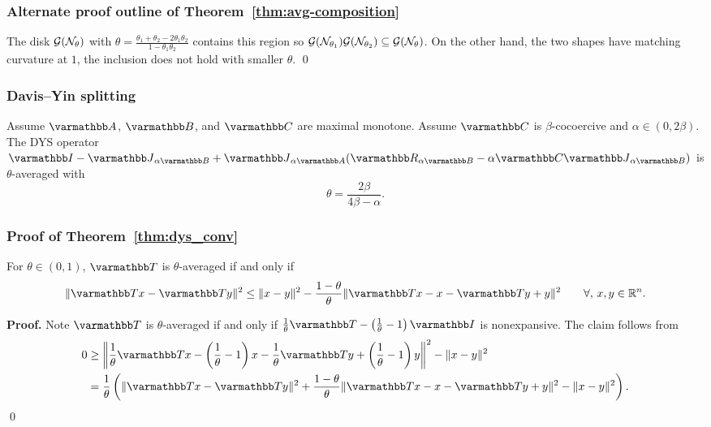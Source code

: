 \documentclass[10pt,mathserif]{beamer}
\begin{document}
\begin{frame}[plain]
\begin{figure}
\begin{subfigure}[b]{0.3\textwidth}
{
}
\end{subfigure}
\end{figure}
\end{frame}

\begin{frame}
\frametitle{Alternate proof outline of Theorem~\ref{thm:avg-composition}}
The disk ${\mathcal{G}}({\mathcal{N}}_\theta)$ with 
$\theta=\frac{\theta_1+\theta_2-2\theta_1\theta_2}{1-\theta_1\theta_2}$
contains this region so ${\mathcal{G}}({\mathcal{N}}_{\theta_1}){\mathcal{G}}({\mathcal{N}}_{\theta_2})\subseteq {\mathcal{G}}({\mathcal{N}}_\theta)$.
On the other hand, the two shapes have matching curvature at $1$, the inclusion does not hold with smaller $\theta$.
\qed
\end{frame}


\begin{frame}
\frametitle{Davis--Yin splitting}
\begin{theorem}
\label{thm:dys_conv}
Assume $\opA$, $\opB$, and $\opC$ are maximal monotone. Assume $\opC$ is $\beta$-cocoercive and $\alpha\in (0,2\beta)$.
The DYS operator $\opI -\opJ_{\alpha \opB}+\opJ_{\alpha \opA}(\opR_{\alpha \opB}-\alpha \opC \opJ_{\alpha \opB})$
is $\theta$-averaged with
\[
\theta=\frac{2\beta}{4\beta-\alpha}.
\]
\vspace{-0.2in}
\end{theorem}
\end{frame}

\begin{frame}
\frametitle{Proof of Theorem~\ref{thm:dys_conv}}
\setcounter{theorem}{4}
\begin{lemma}
\label{lem:avg-characterization}
For $\theta\in(0,1)$, $\opT$ is $\theta$-averaged if and only if
\[
\|\opT x-\opT y\|^2\le\|x-y\|^2-\frac{1-\theta}{\theta}\|\opT x-x-\opT y+y\|^2\qquad\forall,\,x,y\in\reals^n.
\]
\end{lemma}
\textbf{Proof.}
Note $\opT$ is $\theta$-averaged if and only if $\frac{1}{\theta}\opT -\left(\frac{1}{\theta}-1\right)\opI$ is nonexpansive.
The claim follows from
\begin{align*}
0&\ge
\left\|\frac{1}{\theta}\opT x-\left(\frac{1}{\theta}-1\right)x
-\frac{1}{\theta}\opT y+\left(\frac{1}{\theta}-1\right)y
\right\|^2-\|x-y\|^2\\
&=
\frac{1}{\theta}
\left(
\|\opT x-\opT y\|^2+\frac{1-\theta}{\theta}\|\opT x-x-\opT y+y\|^2-\|x-y\|^2
\right).
\end{align*}
\qed
\end{frame}
\end{document}
